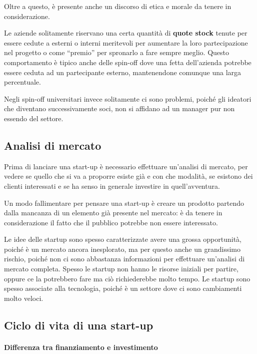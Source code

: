 

Oltre a questo, è presente anche un discorso di etica e morale da tenere in
considerazione.

Le aziende solitamente riservano una certa quantità di \textbf{quote stock}
tenute per essere cedute a esterni o interni meritevoli per aumentare la loro
partecipazione nel progetto o come ``premio'' per spronarlo a fare sempre
meglio. Questo comportamento è tipico anche delle spin-off dove una fetta
dell'azienda potrebbe essere ceduta ad un partecipante esterno, mantenendone
comunque una larga percentuale.

Negli spin-off universitari invece solitamente ci sono problemi, poiché gli
ideatori che diventano successivamente soci, non si affidano ad un manager pur
non essendo del settore.

\subsection{Analisi di mercato}

Prima di lanciare una start-up è necessario effettuare un'analisi di mercato,
per vedere se quello che si va a proporre esiste già e con che modalità, se
esistono dei clienti interessati e se ha senso in generale investire in
quell'avventura.

Un modo fallimentare per pensare una start-up è creare un prodotto partendo
dalla mancanza di un elemento già presente nel mercato: è da tenere in
considerazione il fatto che il pubblico potrebbe non essere interessato.

Le idee delle startup sono spesso caratterizzate avere una grossa opportunità,
poiché è un mercato ancora inesplorato, ma per questo anche un grandissimo
rischio, poiché non ci sono abbastanza informazioni per effettuare un'analisi
di mercato completa. Spesso le startup non hanno le risorse iniziali per
partire, oppure ce la potrebbero fare ma ciò richiederebbe molto tempo. Le
startup sono spesso associate alla tecnologia, poiché è un settore dove ci sono
cambiamenti molto veloci.

\subsection{Ciclo di vita di una start-up}

\paragraph*{Differenza tra finanziamento e investimento} 

